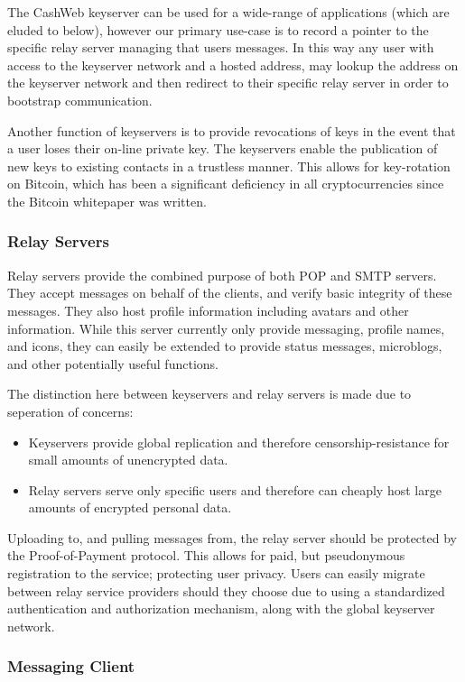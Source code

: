 \documentclass{article}
\begin{document}
The CashWeb keyserver can be used for a wide-range of applications (which are eluded to below), however our primary use-case is to record a pointer to the specific relay server managing that users messages. In this way any user with access to the keyserver network and a hosted address, may lookup the address on the keyserver network and then redirect to their specific relay server in order to bootstrap communication. 

Another function of keyservers is to provide revocations of keys in the event that a user loses their on-line private key. The keyservers enable the publication of new keys to existing contacts in a trustless manner. This allows for key-rotation on Bitcoin, which has been a significant deficiency in all cryptocurrencies since the Bitcoin whitepaper was written.

\subsubsection{Relay Servers}

Relay servers provide the combined purpose of both POP and SMTP servers. They accept messages on behalf of the clients, and verify basic integrity of these messages. They also host profile information including avatars and other information. While this server currently only provide messaging, profile names, and icons, they can easily be extended to provide status messages, microblogs, and other potentially useful functions.

The distinction here between keyservers and relay servers is made due to seperation of concerns:
\begin{itemize}
  \item Keyservers provide global replication and therefore censorship-resistance for small amounts of unencrypted data.
  \item Relay servers serve only specific users and therefore can cheaply host large amounts of encrypted personal data.
\end{itemize}

Uploading to, and pulling messages from, the relay server should be protected by the Proof-of-Payment protocol. This allows for paid, but pseudonymous registration to the service; protecting user privacy. Users can easily migrate between relay service providers should they choose due to using a standardized authentication and authorization mechanism, along with the global keyserver network.

\subsubsection{Messaging Client}
\end{document}
